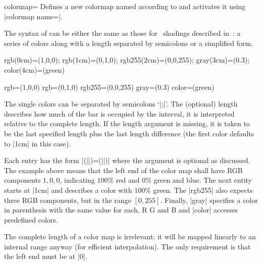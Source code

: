\begin{pgfplotskey}{colormap=}
	Defines a new colormap named  according to  and activates it using |colormap name=|.
	
	The syntax of  can be either the same as those for \PGF\ shadings described in~\cite[VIII -- Shadings]{tikz}: a series of colors along with a length separated by semicolons or a simplified form.
\begin{codeexample}
rgb(0cm)=(1,0,0); rgb(1cm)=(0,1,0); rgb255(2cm)=(0,0,255); gray(3cm)=(0.3);  color(4cm)=(green)
\end{codeexample}

\begin{codeexample}
rgb=(1,0,0) rgb=(0,1,0) rgb255=(0,0,255) gray=(0.3) color=(green)
\end{codeexample}

\noindent The single colors can be separated by semicolons `|;|'. The (optional) length describes how much of the bar is occupied by the interval, it is interpreted relative to the complete length. If the length argument is missing, it is taken to be the last specified length plus the last length difference (the first color defaults to |1cm| in this case). 

Each entry has the form |(||)=(||)| where the  argument is optional as discussed. The example above means that the left end of the color map shall have RGB components $1,0,0$, indicating $100\%$ red and $0\%$ green and blue. The next entity starts at |1cm| and describes a color with $100\%$ green. The |rgb255| also expects three RGB components, but in the range $[0,255]$. Finally, |gray| specifies a color in parenthesis with the same value for each, R G and B and |color| accesses predefined colors.

\begin{codeexample}[]
\end{codeexample}
The complete length of a color map is irrelevant: it will be mapped linearly to an internal range anyway (for efficient interpolation). The only requirement is that the left end must be at |0|.


\end{pgfplotskey}
